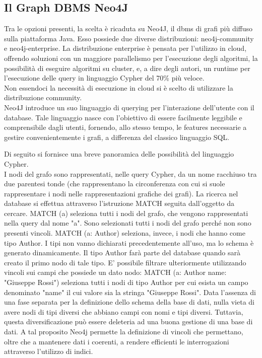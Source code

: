 \documentclass[a4paper,12pt]{article}
\begin{document}
\subsection{Il Graph DBMS Neo4J}
Tra le opzioni presenti, la scelta è ricaduta su Neo4J, il dbms di grafi più diffuso sulla piattaforma Java. Esso possiede due diverse distribuzioni: neo4j-community e neo4j-enterprise. La distribuzione enterprise è pensata per l'utilizzo in cloud, offrendo soluzioni con un maggiore parallelismo per l'esecuzione degli algoritmi, la possibilità di eseguire algoritmi su cluster, e, a dire degli autori, un runtime per l'esecuzione delle query in linguaggio Cypher del 70\% più veloce. \\
Non essendoci la necessità di esecuzione in cloud si è scelto di utilizzare la distribuzione community. \\
Neo4J introduce un suo linguaggio di querying per l'interazione dell'utente con il database. Tale linguaggio nasce con l'obiettivo di essere facilmente leggibile e comprensibile dagli utenti, fornendo, allo stesso tempo, le features necessarie a gestire convenientemente i grafi, a differenza del classico linguaggio SQL.
\par
Di seguito si fornisce una breve panoramica delle possibilità del linguaggio Cypher. \\
I nodi del grafo sono rappresentati, nelle query Cypher, da un nome racchiuso tra due parentesi tonde (che rappresentano la circonferenza con cui si suole rappresentare i nodi nelle rappresentazioni grafiche dei grafi). La ricerca nel database si effettua attraverso l'istruzione MATCH seguita dall'oggetto da cercare.
MATCH (a) seleziona tutti i nodi del grafo, che vengono rappresentati nella query dal nome "a". Sono selezionati tutti i nodi del grafo perché non sono presenti vincoli.
MATCH (a: Author) seleziona, invece, i nodi che hanno come tipo Author. I tipi non vanno dichiarati precedentemente all'uso, ma lo schema è generato dinamicamente. Il tipo Author farà parte del database quando sarà creato il primo nodo di tale tipo.
E' possibile filtrare ulteriormente utilizzando vincoli sui campi che possiede un dato nodo:
MATCH (a: Author {name: "Giuseppe Rossi"}) seleziona tutti i nodi di tipo Author per cui esista un campo denominato "name" il cui valore sia la stringa "Giuseppe Rossi". Data l'assenza di una fase separata per la definizione dello schema della base di dati, nulla vieta di avere nodi di tipi diversi che abbiano campi con nomi e tipi diversi. Tuttavia, questa diversificazione può essere deleteria ad una buona gestione di una base di dati. A tal proposito Neo4j permette la definizione di vincoli che permettano, oltre che a mantenere dati i coerenti, a rendere efficienti le interrogazioni attraverso l'utilizzo di indici.
\end{document}
